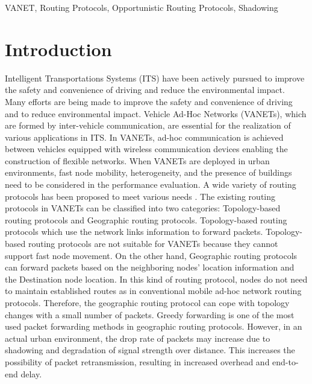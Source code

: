 \documentclass[conference]{IEEEtran}
\begin{document}
\begin{IEEEkeywords}
VANET, Routing Protocols, Opportunistic Routing Protocols, Shadowing
\end{IEEEkeywords}

\section{Introduction}
Intelligent Transportations Systems (ITS) \cite{1} have been actively pursued to improve the safety and convenience of driving and  reduce the environmental impact. 
Many efforts are being made to improve the safety and convenience of driving and  to reduce  environmental impact. Vehicle Ad-Hoc Networks (VANETs), which are formed by inter-vehicle communication, are essential for the realization of various applications in ITS.
In VANETs,  ad-hoc communication is achieved between vehicles equipped with wireless communication devices enabling the construction of flexible networks. 
When VANETs are deployed in  urban environments, fast node mobility, heterogeneity, and the presence of buildings need to be considered in the performance evaluation. A wide variety of routing protocols has been proposed to meet various needs \cite{2}.
The existing routing protocols in VANETs can be classified into two categories: Topology-based routing protocols and Geographic routing protocols. Topology-based routing protocols \cite{3,4,5} which use the network links information to forward packets. 
Topology-based routing protocols are not suitable for VANETs because they cannot support fast node movement. On the other hand, Geographic routing protocols \cite{6,7,8,9,10,11,12,13,14,15} can forward packets based on the neighboring nodes' location information and the Destination node location. In this kind of routing protocol, nodes do not need to maintain established routes as in conventional mobile ad-hoc network routing protocols. Therefore, the geographic routing protocol can cope with topology changes with a small number of packets.
Greedy forwarding is one of the most used packet forwarding methods in geographic routing protocols. However, in an actual urban environment, the drop rate of packets may increase due to shadowing and degradation of signal strength over distance. This increases the possibility of packet retransmission, resulting in increased overhead and end-to-end delay. 
\end{document}
